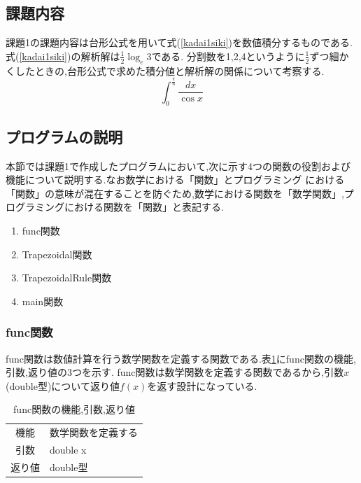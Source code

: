 \documentclass[dvipdfmx]{jarticle}
\begin{document}
    \subsection{課題内容}
    課題1の課題内容は台形公式を用いて式(\ref{kadai1siki})を数値積分するものである.式(\ref{kadai1siki})の解析解は$\frac{1}{2} \log_{e} 3$である.
    分割数を1,2,4というように$\frac{1}{2}$ずつ細かくしたときの,台形公式で求めた積分値と解析解の関係について考察する.
    \begin{equation}
  \int_0^\frac{\pi}{6} \frac{dx}{\cos x}
      \label{kadai1siki}
    \end{equation}

    \subsection{プログラムの説明}
    本節では課題1で作成したプログラムにおいて,次に示す4つの関数の役割および機能について説明する.なお数学における「関数」とプログラミング
    における「関数」の意味が混在することを防ぐため,数学における関数を「数学関数」,プログラミングにおける関数を「関数」と表記する.
    \begin{enumerate}
      \item func関数
      \item Trapezoidal関数
      \item TrapezoidalRule関数
      \item main関数
      \end{enumerate}
    
    \subsubsection{func関数}
    func関数は数値計算を行う数学関数を定義する関数である.表\ref{func1table}にfunc関数の機能,引数,返り値の3つを示す.
    func関数は数学関数を定義する関数であるから,引数$x$(double型)について返り値$f(x)$を返す設計になっている.
      \begin{table}[H]
      \caption{func関数の機能,引数,返り値}
      \label{func1table}
      \begin{center}
          \begin{tabular}{c|l}\hline
        機能 & 数学関数を定義する\\
        引数 & double x \\
        返り値 & double型 \\ \hline
          \end{tabular}
      \end{center}
      \end{table}
\end{document}
